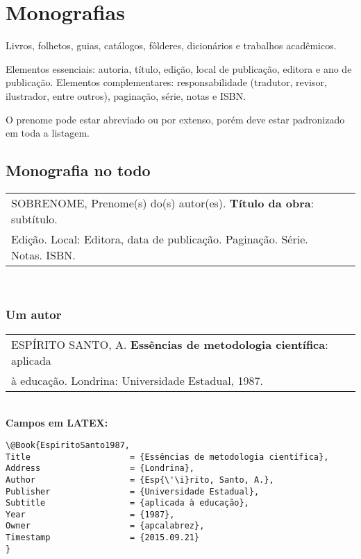 \section{Monografias}

Livros, folhetos, guias, catálogos, fôlderes, dicionários e trabalhos acadêmicos.

Elementos essenciais: autoria, título, edição, local de publicação, editora e ano de publicação.
Elementos complementares: responsabilidade (tradutor, revisor, ilustrador, entre outros), paginação, série, notas e ISBN.

O prenome pode estar abreviado ou por extenso, porém deve estar padronizado em toda a listagem. \\

\subsection{Monografia no todo}

\begin{tabular}{|l|c|} \hline
SOBRENOME, Prenome(s) do(s) autor(es). \textbf{Título da obra}: subtítulo.\\Edição. 
Local:	Editora, data de publicação. Paginação. Série. Notas. ISBN.\\\hline
\end{tabular}\\

\subsubsection{Um autor}

\begin{tabular}{|l|c|} \hline
 ESPÍRITO SANTO, A. \textbf{Essências de metodologia científica}: aplicada \\
 à educação. Londrina: Universidade Estadual, 1987. \\\hline
\end{tabular}\\

\textbf{Campos em LATEX:}

\begin{verbatim}
\@Book{EspiritoSanto1987,
Title                    = {Essências de metodologia científica},
Address                  = {Londrina},
Author                   = {Esp{\'\i}rito, Santo, A.},
Publisher                = {Universidade Estadual},
Subtitle                 = {aplicada à educação},
Year                     = {1987},
Owner                    = {apcalabrez},
Timestamp                = {2015.09.21}
}
\end{verbatim}


